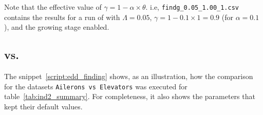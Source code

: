 \begin{center}
\end{center}

Note that the effective value of $\gamma = 1 -\alpha \times \theta$. i.e, \texttt{findg\_0.05\_1.00\_1.csv} contains
the results for a run of \PresQ with $\Lambda = 0.05$, $\gamma = 1 - 0.1 \times 1 = 0.9$ (for $\alpha = 0.1$),
and the growing stage enabled.

\subsection{\Find vs. \PresQ}

The snippet~\ref{script:edd_finding} shows, as an illustration, how the comparison for the
datasets \texttt{Ailerons vs Elevators} was executed for table~\ref{tab:ind2_summary}.
For completeness, it also shows the parameters that kept their default values.


